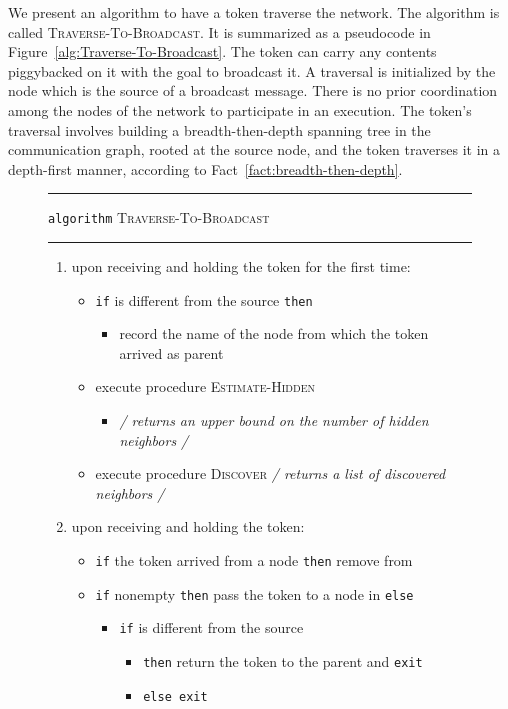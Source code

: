 \documentclass[11pt]{article}
\newcommand{\FF}{\vspace*{\medskipamount}}
\begin{document}
We present an algorithm to have a token traverse the network.
The algorithm is called \textsc{Traverse-To-Broadcast}.
It is summarized as a pseudocode in Figure~\ref{alg:Traverse-To-Broadcast}.
The token can carry any contents piggybacked on it with the goal to broadcast it. 
A traversal is initialized by the node which is the source of a broadcast message. 
There is no prior coordination among the nodes of the network to participate in an execution.
The token's traversal involves building a breadth-then-depth spanning tree in the communication graph, rooted at the source node, and the token traverses it in a depth-first manner, according to Fact~\ref{fact:breadth-then-depth}.




\begin{figure}[t]

\hrule

\FF
 
\texttt{algorithm} \textsc{Traverse-To-Broadcast} 

\FF

\hrule

\FF

\begin{enumerate}[nosep]
\item
upon receiving and holding the token for the first time:  
\begin{itemize}[nosep]
\item[]
\texttt{if}   is different from the source \texttt{then} 
\begin{itemize}[nosep]
\item[]
record the name of the node from which the token arrived as  parent
\end{itemize}
\item[]
execute procedure \textsc{Estimate-Hidden} 
\begin{itemize}[nosep]
\item[]
\hfill 
{\em / returns an upper bound  on the number of hidden neighbors /}
\end{itemize}
\item[]
execute procedure \textsc{Discover} \hfill
{\em / returns a list   of discovered neighbors /}
\end{itemize}
\item
upon receiving and holding the token:
\begin{itemize}[nosep]
\item[]
\texttt{if} the token arrived from a node  \texttt{then} remove  from 
\item[]
\texttt{if}  nonempty \texttt{then} pass the token to a node in  \texttt{else}
\begin{itemize}[nosep]
\item[]
\texttt{if}  is different from the source 
\begin{itemize}[nosep]
\item[]
 \texttt{then} return the token to the parent and \texttt{exit}
 \end{itemize}
\begin{itemize}[nosep]
\item[]
\texttt{else exit}
\end{itemize}
\end{itemize}


\end{itemize}
\end{enumerate}
\end{figure}
\end{document}
